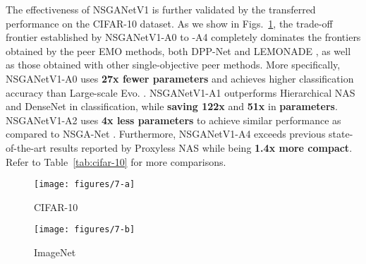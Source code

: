 \documentclass[journal]{IEEEtran}
\def\ourmethod{NSGANetV1}
\theoremstyle{definition}
\theoremstyle{remark}
\def\sota{state-of-the-art}
\begin{document}
The effectiveness of \ourmethod{} is further validated by the transferred performance on the CIFAR-10 dataset. As we show in Figs.~\ref{fig:cifar10}, the trade-off frontier established by \ourmethod{}-A0 to -A4 completely dominates the frontiers obtained by the peer EMO methods, both DPP-Net \cite{dong2018dpp} and LEMONADE \cite{elsken2018efficient}, as well as those obtained with other single-objective peer methods. More specifically, \ourmethod{}-A0 uses {\textbf{27x fewer parameters}} and achieves higher classification accuracy than Large-scale Evo. \cite{real2017largescale}. \ourmethod{}-A1 outperforms Hierarchical NAS \cite{liu2018hierarchical} and DenseNet \cite{densenet} in classification, while {\textbf{saving 122x}} and {\textbf{51x}} in {\textbf{parameters}}. {\ourmethod{}-A2 uses \textbf{4x less parameters} to achieve similar performance as compared to NSGA-Net \cite{lu2019nsga}.} Furthermore, \ourmethod{}-A4 exceeds previous \sota{} results reported by Proxyless NAS \cite{cai2018proxylessnas} while being {\textbf{1.4x more compact}}. Refer to Table~\ref{tab:cifar-10} for more comparisons.

\begin{figure*}[t]
    \centering
    \begin{subfigure}[t]{.48\textwidth}
		\centering
		\texttt{[image: figures/7-a]}
		\caption{CIFAR-10 \label{fig:cifar10}}
	\end{subfigure} \hfill
	\begin{subfigure}[t]{.48\textwidth}
		\centering
		\texttt{[image: figures/7-b]}
		\caption{ImageNet \label{fig:imagenet}}
	\end{subfigure}
\caption{Transferability of the \ourmethod{} architectures to (a) CIFAR-10, and (b) ImageNet. We compare Top-1 Accuracy \emph{vs.} Computational Complexity. Architectures joined by dashed lines are from multi-objective algorithms.}
    \label{fig:cifar10_imagenet}
\end{figure*}
\end{document}
